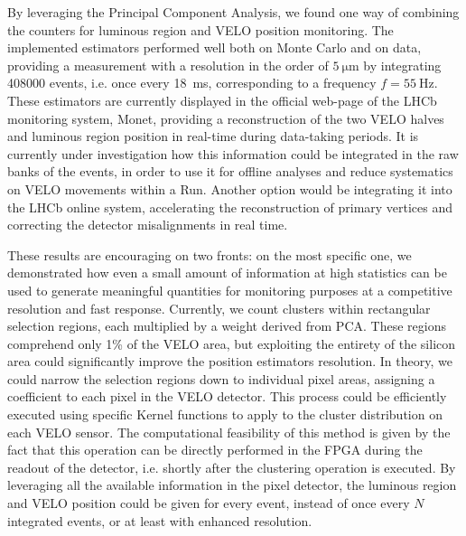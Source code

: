 By leveraging the Principal Component Analysis, we found one way of combining the counters for luminous region and VELO position monitoring. The implemented estimators performed well both on Monte Carlo and on data, providing a measurement with a resolution in the order of $\SI{5}{\micro\meter}$ by integrating 408000 events, i.e. once every \SI{18}{\milli\second}, corresponding to a frequency $f=\SI{55}{\hertz}$. These estimators are currently displayed in the official web-page of the LHCb monitoring system, Monet, providing a reconstruction of the two VELO halves and luminous region position in real-time during data-taking periods. It is currently under investigation how this information could be integrated in the raw banks of the events, in order to use it for offline analyses and reduce systematics on VELO movements within a Run. Another option would be integrating it into the LHCb online system, accelerating the reconstruction of primary vertices and correcting the detector misalignments in real time.

These results are encouraging on two fronts: on the most specific one, we demonstrated how even a small amount of information at high statistics can be used to generate meaningful quantities for monitoring purposes at a competitive resolution and fast response. Currently, we count clusters within rectangular selection regions, each multiplied by a weight derived from PCA. These regions comprehend only 1\% of the VELO area, but exploiting the entirety of the silicon area could significantly improve the position estimators resolution.  In theory, we could narrow the selection regions down to individual pixel areas, assigning a coefficient to each pixel in the VELO detector. This process could be efficiently executed using specific Kernel functions to apply to the cluster distribution on each VELO sensor. 
The computational feasibility of this method is given by the fact that this operation can be directly performed in the FPGA during the readout of the detector, i.e. shortly after the clustering operation is executed. By leveraging all the available information in the pixel detector, the luminous region and VELO position could be given for every event, instead of once every $N$ integrated events, or at least with enhanced resolution.

